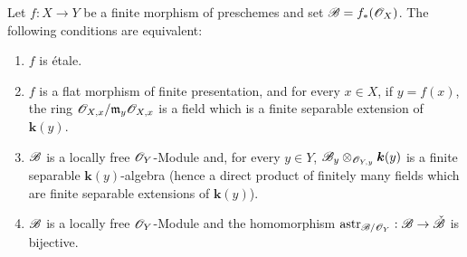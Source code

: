 \begin{proposition}[18.2.3]
\label{IV.18.2.3}
Let $f:X\to Y$ be a \textup{finite} morphism of preschemes and set $\mathscr{B}=f_*(\mathscr{O}_X)$.
The following conditions are equivalent:
\begin{enumerate}
  \item[\textup{a)}] $f$ is \'etale.
  \item[\textup{a$'$)}] $f$ is a flat morphism of finite presentation, and for every $x\in X$, if $y=f(x)$, the ring $\mathscr{O}_{X,x}/\mathfrak{m}_y\mathscr{O}_{X,x}$ is a field which is a finite separable extension of $\boldsymbol{k}(y)$.
  \item[\textup{b)}] $\mathscr{B}$ is a locally free $\mathscr{O}_Y$-Module and, for every $y\in Y$, $\mathscr{B}_y\otimes_{\mathscr{O}_{Y,y}}\boldsymbol{k}(y)$ is a finite separable $\boldsymbol{k}(y)$-algebra \textup{(hence a direct product of finitely many fields which are finite separable extensions of $\boldsymbol{k}(y)$)}.
  \item[\textup{c)}] $\mathscr{B}$ is a locally free $\mathscr{O}_Y$-Module and the homomorphism $\operatorname{astr}_{\mathscr{B}/\mathscr{O}_Y}:\mathscr{B}\to\check{\mathscr{B}}$  is bijective.
\end{enumerate}
\end{proposition}

